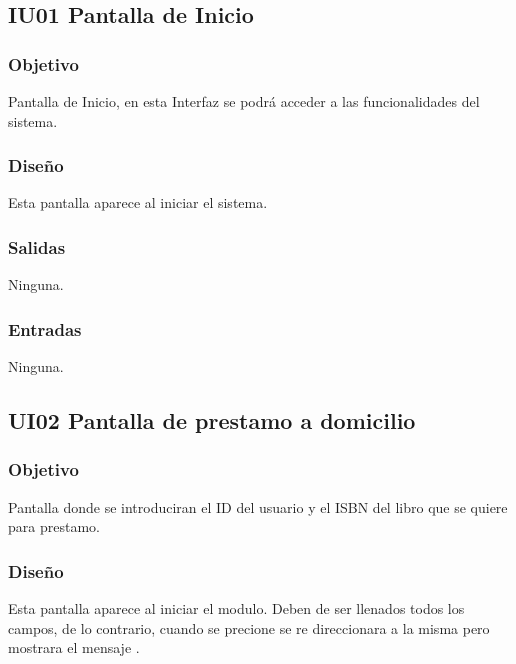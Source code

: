 \newpage
\subsection{IU01 Pantalla de Inicio}

\subsubsection{Objetivo}
	Pantalla de Inicio, en esta Interfaz se podrá acceder a las funcionalidades del sistema.  

\subsubsection{Diseño}
	Esta pantalla aparece al iniciar el sistema.  


\subsubsection{Salidas}
	\begin{Citemize}
		\item Ninguna. 
	\end{Citemize}
	
\subsubsection{Entradas}
	\begin{Citemize}
		\item Ninguna.
	\end{Citemize}







\newpage
\subsection{UI02 Pantalla de prestamo a domicilio}

\subsubsection{Objetivo}
	Pantalla donde se introduciran el ID del usuario y el ISBN del libro que se quiere para prestamo.

\subsubsection{Diseño}
	Esta pantalla aparece al iniciar el modulo. Deben de ser llenados todos los campos, de lo contrario, cuando se precione   se re direccionara a la misma pero mostrara el mensaje .

